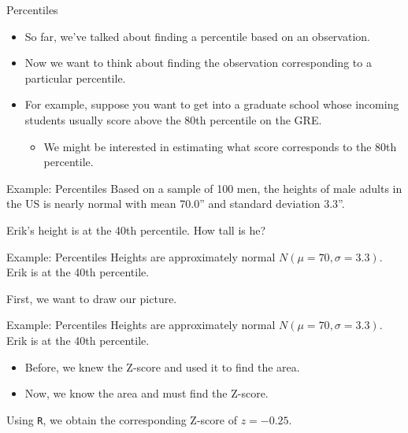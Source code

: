 \begin{frame}{Percentiles}
    \begin{itemize}
        \item So far, we've talked about finding a percentile based on an observation.
        \item Now we want to think about finding the observation corresponding to a particular percentile.
        \item For example, suppose you want to get into a graduate school whose incoming students usually score above the 80th percentile on the GRE.
        \begin{itemize}
            \item We might be interested in estimating what score corresponds to the 80th percentile.
        \end{itemize}
    \end{itemize}
\end{frame}

\begin{frame}{Example: Percentiles}
    Based on a sample of 100 men, the heights of male adults in the US is nearly normal with mean 70.0” and standard deviation 3.3”. 
    
    \vspace{12pt}Erik’s height is at the 40th percentile. How tall is he?
\end{frame}

\begin{frame}{Example: Percentiles}
    Heights are approximately normal $N(\mu=70, \sigma=3.3)$. Erik is at the 40th percentile.
    
    \vspace{12pt}First, we want to draw our picture.
\end{frame}

\begin{frame}{Example: Percentiles}
    Heights are approximately normal $N(\mu=70, \sigma=3.3)$. Erik is at the 40th percentile.
    
    \vspace{12pt}\begin{itemize}
        \item Before, we knew the Z-score and used it to find the area.
        \item Now, we know the area and must find the Z-score.
    \end{itemize}
    
    Using \texttt{R}, we obtain the corresponding Z-score of $z=-0.25$.
\end{frame}


